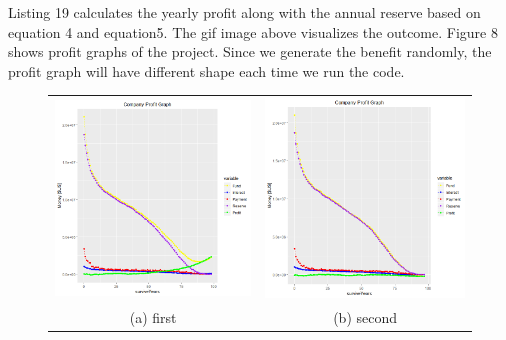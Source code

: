 \documentclass[12pt]{article}
\begin{document}

Listing 19 calculates the yearly profit along with the annual reserve based on equation 4 and equation5. The gif image above visualizes the outcome. Figure 8 shows profit graphs of the project. Since we generate the benefit randomly, the profit graph will have different shape each time we run the code.
\begin{figure}[h]
	\begin{tabular}{cc}
		\includegraphics[width=65mm]{report_profit.PNG} &   \includegraphics[width=65mm]{profit1.PNG} \\
		(a) first & (b) second \\[6pt]

\end{tabular}
\end{figure}
\end{document}
